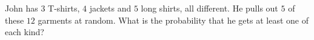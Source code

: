 John has $3$ T-shirts, $4$ jackets and $5$ long shirts, all different. He pulls out $5$ of these $12$ garments at random. What is the probability that he gets at least one of each kind?
